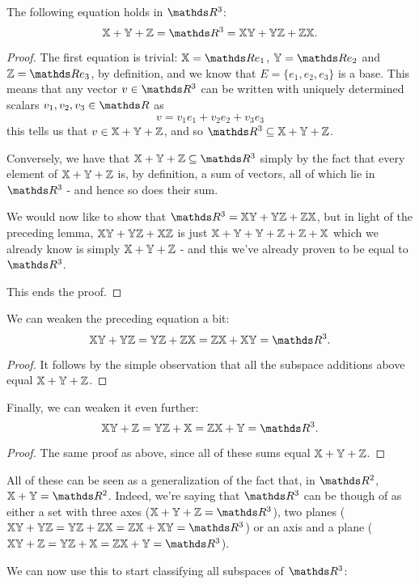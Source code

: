 \begin{cor}
	The following equation holds in $\R^3$:
	\[\mb{X+Y+Z}=\R^3=\mb{XY+YZ+ZX}.\]
\end{cor}
\begin{proof}
	The first equation is trivial: $\mb X=\R e_1$, $\mb Y=\R e_2$ and $\mb Z=\R e_3$, by definition, and we know that $E=\{e_1,e_2,e_3\}$ is a base. This means that any vector $v\in \R^3$ can be written with uniquely determined scalars $v_1,v_2,v_3\in\R$ as
	\[v=v_1e_1+v_2e_2+v_3e_3\]this tells us that $v\in \mathbb{X+Y+Z}$, and so $\R^3\subseteq \mb{X+Y+Z}$.
	
	Conversely, we have that $\mb{X+Y+Z}\subseteq \R^3$ simply by the fact that every element of $\mathbb{X+Y+Z}$ is, by definition, a sum of vectors, all of which lie in $\R^3$ - and hence so does their sum.
	
	\bigskip
	We would now like to show that $\R^3=\mb{XY+YZ+ZX}$, but in light of the preceding lemma, $\mathbb{XY+YZ+XZ}$ is just $\mathbb{X+Y+Y+Z+Z+X}$ which we already know is simply $\mathbb{X+Y+Z}$ - and this we've already proven to be equal to $\R^3$.
	
	This ends the proof.
\end{proof}
\begin{cor}
	We can weaken the preceding equation a bit:
	\[\mb{XY+YZ=YZ+ZX=ZX+XY}=\R^3.\]
\end{cor}
\begin{proof}
	It follows by the simple observation that all the subspace additions above equal $\mathbb{X+Y+Z}$.
\end{proof}
\begin{cor}
	Finally, we can weaken it even further:
	\[\mb{XY+Z=YZ+X=ZX+Y}=\R^3.\]
\end{cor}
\begin{proof}
	The same proof as above, since all of these sums equal $\mathbb{X+Y+Z}$.
\end{proof}
\begin{rmk}
	All of these can be seen as a generalization of the fact that, in $\R^2$, $\mb{X+Y}=\R^2$. Indeed, we're saying that $\R^3$ can be though of as either a set with three axes ($\mb{X+Y+Z}=\R^3$), two planes ($\mb{XY+YZ=YZ+ZX=ZX+XY}=\R^3$) or an axis and a plane ($\mb{XY+Z=YZ+X=ZX+Y}=\R^3$).
\end{rmk}

We can now use this to start classifying all subspaces of $\R^3$:

